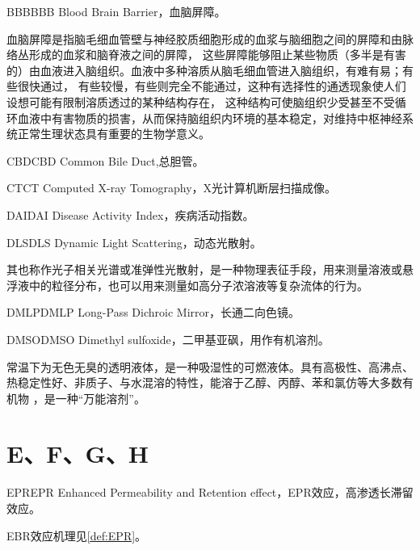 \documentclass[cn,11pt,chinese]{elegantbook}
\begin{document}
\begin{theorem}{BBB}{BBB} 
Blood Brain Barrier，血脑屏障。

血脑屏障是指脑毛细血管壁与神经胶质细胞形成的血浆与脑细胞之间的屏障和由脉络丛形成的血浆和脑脊液之间的屏障，
这些屏障能够阻止某些物质（多半是有害的）由血液进入脑组织。血液中多种溶质从脑毛细血管进入脑组织，有难有易；有些很快通过，
有些较慢，有些则完全不能通过，这种有选择性的通透现象使人们设想可能有限制溶质透过的某种结构存在，
这种结构可使脑组织少受甚至不受循环血液中有害物质的损害，从而保持脑组织内环境的基本稳定，对维持中枢神经系统正常生理状态具有重要的生物学意义。
\end{theorem}

\begin{theorem}{CBD}{CBD}
Common Bile Duct,总胆管。
\end{theorem}

\begin{theorem}{CT}{CT}
 Computed X-ray Tomography，X光计算机断层扫描成像。
  \end{theorem}


\begin{theorem}{DAI}{DAI}
 Disease Activity Index，疾病活动指数。

\end{theorem}

\begin{theorem}{DLS}{DLS}
Dynamic Light Scattering，动态光散射。

其也称作光子相关光谱或准弹性光散射，是一种物理表征手段，用来测量溶液或悬浮液中的粒径分布，也可以用来测量如高分子浓溶液等复杂流体的行为。
\end{theorem}

\begin{theorem}{DMLP}{DMLP}
 	Long-Pass Dichroic Mirror，长通二向色镜。
  \end{theorem}

\begin{theorem}{DMSO}{DMSO}
  Dimethyl sulfoxide，二甲基亚砜，用作有机溶剂。

  常温下为无色无臭的透明液体，是一种吸湿性的可燃液体。具有高极性、高沸点、热稳定性好、非质子、与水混溶的特性，能溶于乙醇、丙醇、苯和氯仿等大多数有机物
  ，是一种“万能溶剂”。
  \end{theorem}
\section{E、F、G、H}
\begin{theorem}{EPR}{EPR} 
  Enhanced Permeability and Retention effect，EPR效应，高渗透长滞留效应。

 \end{theorem}
 \begin{note}
   EBR效应机理见\vref{def:EPR}。
 \end{note}
\end{document}
